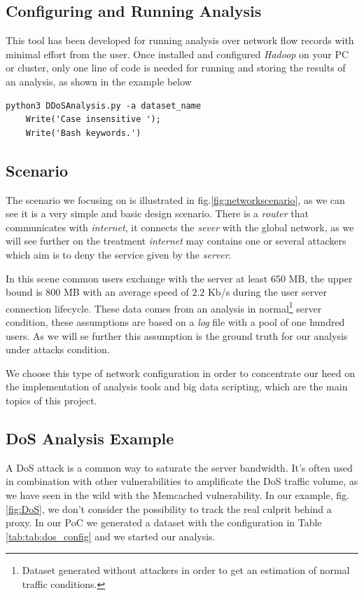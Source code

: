 \subsection{Configuring and Running Analysis}
This tool has been developed for running analysis over network flow records with minimal effort from the user. Once installed and configured \textit{Hadoop} on your PC or cluster, only one line of code is needed for running and storing the results of an analysis, as shown in the example below

\begin{lstlisting}[firstline=1, lastline=1]
   python3 DDoSAnalysis.py -a dataset_name
	Write('Case insensitive '); 
	Write('Bash keywords.')
\end{lstlisting}

\subsection{Scenario} 
The scenario we focusing on is illustrated in fig.\ref{fig:networkscenario}, as we can see it is a very simple and basic design scenario. There is a \textit{router} that communicates with \textit{internet},  it connects the \textit{sever} with the global network, as we will see further on the treatment \textit{internet} may contains one or several attackers which aim is to deny the service given by the \textit{server}. 

In this scene common users exchange with the server at least 650 MB, the upper bound is $800$ MB with an average speed of $2.2$ Kb/s during the user server connection lifecycle. These data comes from an analysis in normal\footnote{Dataset generated without attackers in order to get an estimation of normal traffic conditions.} server condition, these assumptions are based on a \textit{log} file with a pool of one hundred users. As we will se further this assumption is the ground truth for our analysis under attacks condition.

We choose this type of network configuration in order to concentrate our heed on the implementation of analysis tools and big data scripting, which are the main topics of this project.
  
\subsection{DoS Analysis Example}
A DoS attack is a common way to saturate the server bandwidth. It's often used in combination with other vulnerabilities to amplificate the DoS traffic volume, as we have seen in the wild with the Memcached vulnerability\cite{memcached_vulnerability}. In our example, fig. \ref{fig:DoS}, we don't consider the possibility to track the real culprit behind a proxy.
In our PoC we generated a dataset with the configuration in Table \ref{tab:tab:dos_config} and we started our analysis.

